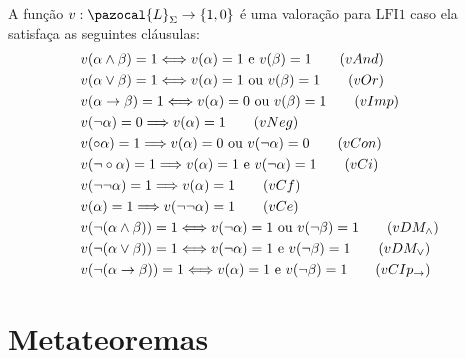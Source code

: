        \begin{definicao} 
            \label{def:valoracoes}
            A função $v : \pazocal{L}_{\Sigma} \rightarrow \{1, 0\}$ é uma valoração para $\text{LFI1}$ caso ela satisfaça as seguintes cláusulas:
            \begin{align*}
                & v(\alpha \land \beta) = 1 \Longleftrightarrow v(\alpha) = 1 \text{ e } v(\beta) = 1\tag{\textbf{$vAnd$}}\\
                & v(\alpha \lor \beta) = 1 \Longleftrightarrow v(\alpha) = 1 \text{ ou } v(\beta) = 1\tag{\textbf{$vOr$}}\\
                & v(\alpha \rightarrow \beta) = 1 \Longleftrightarrow v(\alpha) = 0 \text{ ou } v(\beta) = 1\tag{\textbf{$vImp$}}\\
                & v(\neg \alpha) = 0 \Longrightarrow v(\alpha) = 1\tag{\textbf{$vNeg$}}\\
                & v(\circ \alpha) = 1 \Longrightarrow v(\alpha) = 0 \text{ ou } v(\neg \alpha) = 0\tag{\textbf{$vCon$}}\\
                & v(\neg \circ \alpha) = 1 \Longrightarrow v(\alpha) = 1 \text{ e } v(\neg \alpha) = 1\tag{\textbf{$vCi$}}\\
                & v(\neg \neg \alpha) = 1 \Longrightarrow v(\alpha) = 1\tag{\textbf{$vCf$}}\\
                & v(\alpha) = 1 \Longrightarrow v(\neg \neg \alpha) = 1\tag{\textbf{$vCe$}}\\
                & v(\neg (\alpha \land \beta)) = 1 \Longleftrightarrow v(\neg \alpha) = 1 \text{ ou } v(\neg \beta) = 1\tag{\textbf{$vDM_{\land}$}}\\
                & v(\neg (\alpha \lor \beta)) = 1 \Longleftrightarrow v(\neg \alpha) = 1 \text{ e } v(\neg \beta) = 1\tag{\textbf{$vDM_{\lor}$}}\\
                & v(\neg (\alpha \rightarrow \beta)) = 1 \Longleftrightarrow v(\alpha) = 1 \text{ e } v(\neg \beta) = 1\tag{\textbf{$vCIp_{\rightarrow}$}}
            \end{align*}
            
        \end{definicao}

\section{Metateoremas}
\label{sec:metateoremas}
